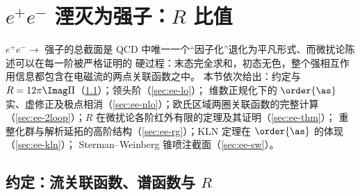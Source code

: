 \section{\texorpdfstring{$e^+e^-$}{e+e-} 湮灭为强子：\texorpdfstring{$R$}{R} 比值}
\label{sec:ee}

$e^+e^-\to$ 强子的总截面是 QCD 中唯一一个“因子化”退化为平凡形式、而微扰论陈述可以在每一阶被严格证明的
硬过程：末态完全求和，初态无色，整个强相互作用信息都包含在电磁流的两点关联函数之中。
本节依次给出：约定与 $R=12\pi\Imag\Pi$（\cref{sec:ee-conv}）；领头阶（\cref{sec:ee-lo}）；
维数正规化下的 $\order{\as}$ 实、虚修正及极点相消（\cref{sec:ee-nlo}）；欧氏区域两圈关联函数的完整计算
（\cref{sec:ee-2loop}）；$R$ 在微扰论各阶红外有限的定理及其证明（\cref{sec:ee-thm}）；
重整化群与解析延拓的高阶结构（\cref{sec:ee-rg}）；KLN 定理在 $\order{\as}$ 的体现（\cref{sec:ee-kln}）；
Sterman--Weinberg 锥喷注截面（\cref{sec:ee-sw}）。

\subsection{约定：流关联函数、谱函数与 \texorpdfstring{$R$}{R}}\label{sec:ee-conv}

